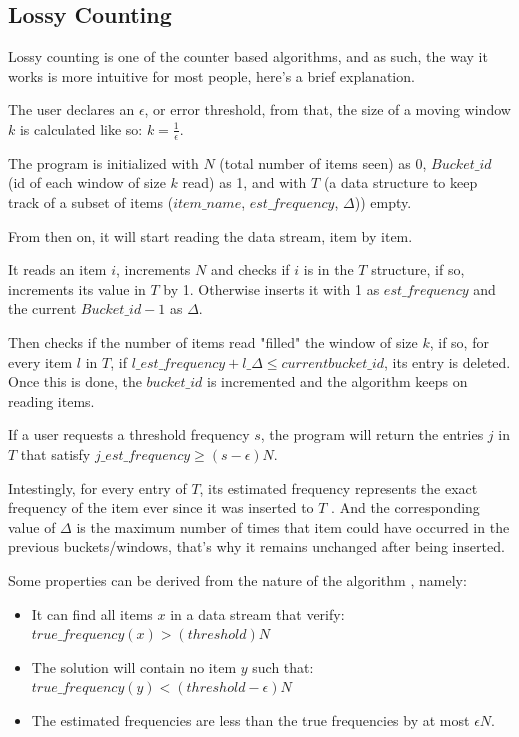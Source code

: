 \documentclass[...]{revdetua}
\begin{document}
\subsection{Lossy Counting}
Lossy counting is one of the counter based algorithms, and as such, the way it works is more intuitive for most people, here's a brief explanation.\par
The user declares an $\epsilon$, or error threshold, from that, the size of a moving window $k$ is calculated like so: $k=\frac{1}{\epsilon}$.\par
The program is initialized with $N$ (total number of items seen) as 0, $Bucket\_id$ (id of each window of size $k$ read) as 1, and with $T$ (a data structure to keep track of a subset of items ($item\_name$, $est\_frequency$, $\Delta$)) empty.\par
From then on, it will start reading the data stream, item by item.\par
It reads an item $i$, increments $N$ and checks if $i$ is in the $T$ structure, if so, increments its value in $T$ by 1. Otherwise inserts it with 1 as $est\_frequency$ and the current $Bucket\_id - 1$ as $\Delta$.\par
Then checks if the number of items read "filled" the window of size $k$, if so, for every item $l$ in $T$, if $l\_est\_frequency + l\_\Delta \leq current bucket\_id$, its entry is deleted. Once this is done, the $bucket\_id$ is incremented and the algorithm keeps on reading items.\par
If a user requests a threshold  frequency $s$, the program will return the entries $j$ in $T$ that satisfy $j\_est\_frequency \geq (s-\epsilon)N$.\par 
Intestingly, for every entry of $T$, its estimated frequency represents the exact frequency of the item ever since it was inserted to $T$ \cite{Manku}. And the corresponding value of $\Delta$ is the maximum number of times that item could have occurred in the previous buckets/windows, that's why it remains unchanged after being inserted.\par
Some properties can be derived from the nature of the algorithm \cite{Manku}, namely:
\begin{itemize}
\item It can find all items $x$ in a data stream that verify: $true\_frequency(x)>(threshold)N$
\item The solution will contain no item $y$ such that: $true\_frequency(y)<(threshold-\epsilon)N$
\item The estimated frequencies are less than the true frequencies by at most $\epsilon N$.
\end{itemize}
\end{document}
